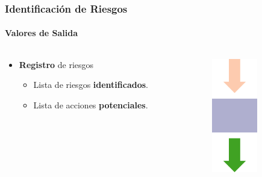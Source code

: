 \begin{frame}
\frametitle{Identificación de Riesgos}
\framesubtitle{Valores de Salida}

\begin{columns}
	\begin{column}{0.8\textwidth}
\begin{itemize}
    \item<1-> \textbf{Registro} de riesgos
    \begin{itemize}
        \item<2-> Lista de riesgos \textbf{identificados}.
        \item<3-> Lista de acciones \textbf{potenciales}.
    \end{itemize}
\end{itemize}
	\end{column}
	\begin{column}{0.2\textwidth}
		\includegraphics[width=2cm]{img/output}
	\end{column}
\end{columns}
\end{frame}
